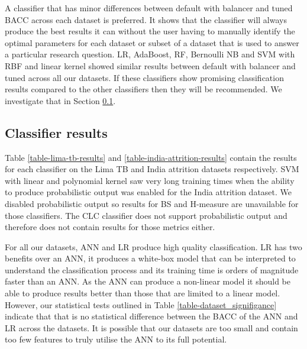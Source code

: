 \documentclass{sig-alternate-05-2015}
\begin{document}
	A classifier that has minor differences between default with balancer and tuned BACC across each dataset is preferred. It shows that the classifier will always produce the best results it can without the user having to manually identify the optimal parameters for each dataset or subset of a dataset that is used to answer a particular research question. LR, AdaBoost, RF, Bernoulli NB and SVM with RBF and linear kernel showed similar results between default with balancer and tuned across all our datasets. If these classifiers show promising classification results compared to the other classifiers then they will be recommended. We investigate that in Section \ref{classifier-results}.

	\subsection{Classifier results}
	\label{classifier-results}
	Table \ref{table-lima-tb-results} and \ref{table-india-attrition-results} contain the results for each classifier on the Lima TB and India attrition datasets respectively. SVM with linear and polynomial kernel saw very long training times when the ability to produce probabilistic output was enabled for the India attrition dataset. We disabled probabilistic output so results for BS and H-measure are unavailable for those classifiers. The CLC classifier does not support probabilistic output and therefore does not contain results for those metrics either.
	
	For all our datasets, ANN and LR produce high quality classification. LR has two benefits over an ANN, it produces a white-box model that can be interpreted to understand the classification process \cite{Dreiseitl2002352} and its training time is orders of magnitude faster than an ANN. As the ANN can produce a non-linear model it should be able to produce results better than those that are limited to a linear model. However, our statistical tests outlined in Table \ref{table-dataset_signifigance} indicate that that is no statistical difference between the BACC of the ANN and LR across the datasets. It is possible that our datasets are too small and contain too few features to truly utilise the ANN to its full potential. 
	
\end{document}
